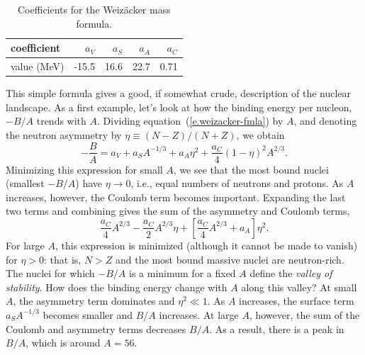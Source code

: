 \begin{table}[htbp]
\label{t.liquid-drop}
\caption{Coefficients for the Weiz\"acker mass formula.\label{t.liquid-drop-coefficients}}
\begin{center}
\begin{tabular}{l|rrrr}
\hline
coefficient & $a_{V}$ & $a_{S}$ & $a_{A}$ & $a_{C}$\\
\hline\hline
value (MeV) & -15.5 & 16.6 & 22.7 & 0.71\\
\hline
\end{tabular}
\end{center}
\end{table}

This simple formula gives a good, if somewhat crude, description of the nuclear landscape.  As a first example,  let's look at how the binding energy per nucleon, $-B/A$ trends with $A$.  Dividing equation~(\ref{e.weizacker-fmla}) by $A$, and denoting the neutron asymmetry by $\eta \equiv (N-Z)/(N+Z)$, we obtain
\begin{equation}\label{e.binding-energy-per-nucleon}
 -\frac{B}{A} = a_{V} + a_{S} A^{-1/3} + a_{A}\eta^{2} + \frac{a_{C}}{4} \left( 1-\eta\right)^{2} A^{2/3}.
\end{equation}
Minimizing this expression for small $A$, we see that the most bound nuclei (smallest $-B/A$) have $\eta \to 0$, i.e., equal numbers of neutrons and protons.  As $A$ increases, however, the Coulomb term becomes important.  Expanding the last two terms and combining gives the sum of the asymmetry and Coulomb terms,
\[ \frac{a_{C}}{4} A^{2/3} - \frac{a_{C}}{2}A^{2/3}\eta + \left[ \frac{a_{C}}{4}A^{2/3} + a_{A} \right] \eta^{2} .\]
For large $A$, this expression is minimized (although it cannot be made to vanish) for $\eta > 0$: that is, $N>Z$ and the most bound massive nuclei are neutron-rich. The nuclei for which $-B/A$ is a minimum for a fixed $A$ define the \emph{valley of stability}. How does the binding energy change with $A$ along this valley?  At small $A$, the asymmetry term dominates and $\eta^{2}\ll 1$.  As $A$ increases, the surface term $a_{S}A^{-1/3}$ becomes smaller and $B/A$ increases.  At large $A$, however, the sum of the Coulomb and asymmetry terms decreases $B/A$.  As a result, there is a peak in $B/A$, which is around $A = 56$.

